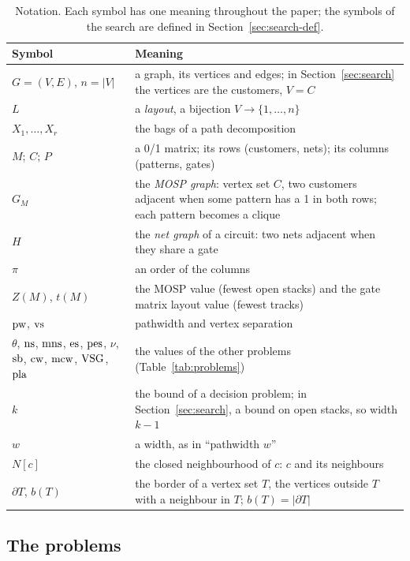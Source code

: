 \begin{table}[tbp]
\centering\small
\caption{Notation. Each symbol has one meaning throughout the paper; the
symbols of the search are defined in Section~\ref{sec:search-def}.}
\label{tab:notation}
\begin{tabularx}{\linewidth}{@{}>{\raggedright}p{3.2cm}>{\raggedright\arraybackslash}X@{}}
\toprule
Symbol & Meaning \\
\midrule
$G=(V,E)$, $n=|V|$ & a graph, its vertices and edges; in Section~\ref{sec:search} the vertices are the customers, $V=C$ \\
$L$ & a \emph{layout}, a bijection $V\to\{1,\dots,n\}$ \\
$X_1,\dots,X_r$ & the bags of a path decomposition \\
$M$; $C$; $P$ & a 0/1 matrix; its rows (customers, nets); its columns (patterns, gates) \\
$G_M$ & the \emph{MOSP graph}: vertex set $C$, two customers adjacent when some pattern has a 1 in both rows; each pattern becomes a clique \\
$H$ & the \emph{net graph} of a circuit: two nets adjacent when they share a gate \\
$\pi$ & an order of the columns \\
$Z(M)$, $t(M)$ & the MOSP value (fewest open stacks) and the gate matrix layout value (fewest tracks) \\
$\mathrm{pw}$, $\mathrm{vs}$ & pathwidth and vertex separation \\
$\theta$, $\mathrm{ns}$, $\mathrm{mns}$, $\mathrm{es}$, $\mathrm{pes}$, $\nu$, $\mathrm{sb}$, $\mathrm{cw}$, $\mathrm{mcw}$, $\mathrm{VSG}$, $\mathrm{pla}$ & the values of the other problems (Table~\ref{tab:problems}) \\
$k$ & the bound of a decision problem; in Section~\ref{sec:search}, a bound on open stacks, so width $k-1$ \\
$w$ & a width, as in ``pathwidth $w$'' \\
$N[c]$ & the closed neighbourhood of $c$: $c$ and its neighbours \\
$\partial T$, $b(T)$ & the border of a vertex set $T$, the vertices outside $T$ with a neighbour in $T$; $b(T)=|\partial T|$ \\
\bottomrule
\end{tabularx}
\end{table}

\subsection{The problems}
\label{sec:problems}


